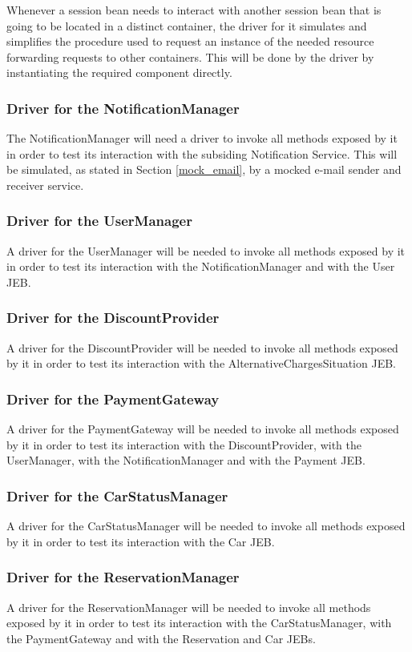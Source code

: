 Whenever a session bean needs to interact with another session bean that is going to be located in  a distinct container, the driver for it simulates and simplifies the procedure used to request an instance of the needed resource forwarding requests to other containers. This will be done by the driver by instantiating the required component directly.

\subsubsection{Driver for the NotificationManager}
The NotificationManager will need a driver to invoke all methods exposed by it in order to test its interaction with the subsiding Notification Service. This will be simulated, as stated in Section \ref{mock_email}, by a mocked e-mail sender and receiver service.

\subsubsection{Driver for the UserManager}
A driver for the UserManager will be needed to invoke all methods exposed by it in order to test its interaction with the NotificationManager and with the User JEB.

\subsubsection{Driver for the DiscountProvider}
A driver for the DiscountProvider will be needed to invoke all methods exposed by it in order to test its interaction with the AlternativeChargesSituation JEB.

\subsubsection{Driver for the PaymentGateway}
A driver for the PaymentGateway will be needed to invoke all methods exposed by it in order to test its interaction with the DiscountProvider, with the UserManager, with the NotificationManager and with the Payment JEB.

\subsubsection{Driver for the CarStatusManager}
A driver for the CarStatusManager will be needed to invoke all methods exposed by it in order to test its interaction with the Car JEB.

\subsubsection{Driver for the ReservationManager}
A driver for the ReservationManager will be needed to invoke all methods exposed by it in order to test its interaction with the CarStatusManager, with the PaymentGateway and with the Reservation and Car JEBs.

